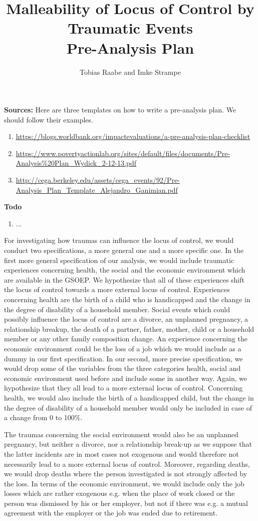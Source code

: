 \documentclass{scrreprt}
\author{Tobias Raabe and Imke Strampe}
\title{Malleability of Locus of Control by Traumatic Events\\[0.5cm]
\Large Pre-Analysis Plan}
\begin{document}
\maketitle

\textbf{Sources:} Here are three templates on how to write a pre-analysis plan.
We should follow their examples.
\begin{enumerate}
    \item \url{https://blogs.worldbank.org/impactevaluations/a-pre-analysis-plan-checklist}
    \item \url{https://www.povertyactionlab.org/sites/default/files/documents/Pre-Analysis\%20Plan_Wydick_2-12-13.pdf}
    \item \url{http://cega.berkeley.edu/assets/cega_events/92/Pre-Analysis_Plan_Template_Alejandro_Ganimian.pdf}
\end{enumerate}

\textbf{Todo}
\begin{enumerate}
    \item ...
\end{enumerate}

For investigating how traumas can influence the locus of control, we would
conduct two specifications, a more general one and a more specific one. In the
first more general specification of our analysis, we would include traumatic
experiences concerning health, the social and the economic environment which
are available in the GSOEP. We hypothesize that all of these experiences shift
the locus of control towards a more external locus of control. Experiences
concerning health are the birth of a child who is handicapped and the change in
the degree of disability of a household member. Social events which could
possibly influence the locus of control are a divorce, an unplanned pregnancy,
a relationship breakup, the death of a partner, father, mother, child or a
household member or any other family composition change. An experience
concerning the economic environment could be the loss of a job which we would
include as a dummy in our first specification. In our second, more precise
specification, we would drop some of the variables from the three categories
health, social and economic environment used before and include some in another
way. Again, we hypothesize that they all lead to a more external locus of
control. Concerning health, we would also include the birth of a handicapped
child, but the change in the degree of disability of a household member would
only be included in case of a change from 0 to 100\%.

The traumas concerning the social environment would also be an unplanned
pregnancy, but neither a divorce, nor a relationship break-up as we suppose
that the latter incidents are in most cases not exogenous and would therefore
not necessarily lead to a more external locus of control. Moreover, regarding
deaths, we would drop deaths where the person investigated is not strongly
affected by the loss. In terms of the economic environment, we would include
only the job losses which are rather exogenous e.g. when the place of work
closed or the person was dismissed by his or her employer, but not if there was
e.g. a mutual agreement with the employer or the job was ended due to
retirement.
\end{document}
